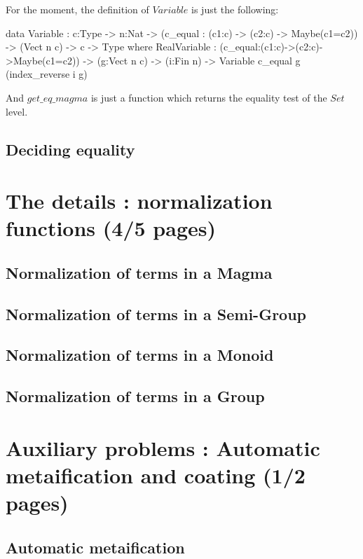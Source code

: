 \documentclass{sigplanconf}
\begin{document}
For the moment, the definition of $Variable$ is just the following:

\begin{code}[caption=Reflected variables, captionpos=b, label=lst1:haskell2]  
data Variable : {c:Type} -> {n:Nat} -> 
         (c_equal : (c1:c) -> (c2:c) -> Maybe(c1=c2)) 
      -> (Vect n c) -> c -> Type where
    RealVariable :
             (c_equal:(c1:c)->(c2:c)->Maybe(c1=c2))
             -> (g:Vect n c) -> (i:Fin n) 
             -> Variable c_equal g (index_reverse i g) 
\end{code}	

And $get\_eq\_magma$ is just a function which returns the equality test of the $Set$ level.

	\subsection {Deciding equality}

\section {The details : normalization functions (4/5 pages)}

	\subsection {Normalization of terms in a Magma}

	\subsection {Normalization of terms in a Semi-Group}

	\subsection {Normalization of terms in a Monoid}

	\subsection {Normalization of terms in a Group}

\section {Auxiliary problems : Automatic metaification and coating (1/2 pages)}

	\subsection {Automatic metaification}
\end{document}
